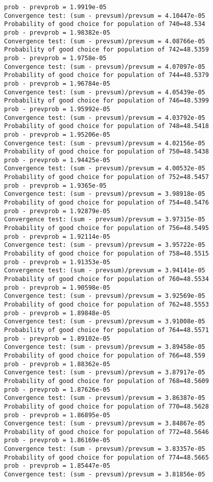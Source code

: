 \documentclass[11pt,onecolumn]{article}
\begin{document}
\begin{verbatim}
prob - prevprob = 1.9919e-05
Convergence test: (sum - prevsum)/prevsum = 4.10447e-05
Probability of good choice for population of 740=48.534
prob - prevprob = 1.98382e-05
Convergence test: (sum - prevsum)/prevsum = 4.08766e-05
Probability of good choice for population of 742=48.5359
prob - prevprob = 1.9758e-05
Convergence test: (sum - prevsum)/prevsum = 4.07097e-05
Probability of good choice for population of 744=48.5379
prob - prevprob = 1.96784e-05
Convergence test: (sum - prevsum)/prevsum = 4.05439e-05
Probability of good choice for population of 746=48.5399
prob - prevprob = 1.95992e-05
Convergence test: (sum - prevsum)/prevsum = 4.03792e-05
Probability of good choice for population of 748=48.5418
prob - prevprob = 1.95206e-05
Convergence test: (sum - prevsum)/prevsum = 4.02156e-05
Probability of good choice for population of 750=48.5438
prob - prevprob = 1.94425e-05
Convergence test: (sum - prevsum)/prevsum = 4.00532e-05
Probability of good choice for population of 752=48.5457
prob - prevprob = 1.9365e-05
Convergence test: (sum - prevsum)/prevsum = 3.98918e-05
Probability of good choice for population of 754=48.5476
prob - prevprob = 1.92879e-05
Convergence test: (sum - prevsum)/prevsum = 3.97315e-05
Probability of good choice for population of 756=48.5495
prob - prevprob = 1.92114e-05
Convergence test: (sum - prevsum)/prevsum = 3.95722e-05
Probability of good choice for population of 758=48.5515
prob - prevprob = 1.91353e-05
Convergence test: (sum - prevsum)/prevsum = 3.94141e-05
Probability of good choice for population of 760=48.5534
prob - prevprob = 1.90598e-05
Convergence test: (sum - prevsum)/prevsum = 3.92569e-05
Probability of good choice for population of 762=48.5553
prob - prevprob = 1.89848e-05
Convergence test: (sum - prevsum)/prevsum = 3.91008e-05
Probability of good choice for population of 764=48.5571
prob - prevprob = 1.89102e-05
Convergence test: (sum - prevsum)/prevsum = 3.89458e-05
Probability of good choice for population of 766=48.559
prob - prevprob = 1.88362e-05
Convergence test: (sum - prevsum)/prevsum = 3.87917e-05
Probability of good choice for population of 768=48.5609
prob - prevprob = 1.87626e-05
Convergence test: (sum - prevsum)/prevsum = 3.86387e-05
Probability of good choice for population of 770=48.5628
prob - prevprob = 1.86895e-05
Convergence test: (sum - prevsum)/prevsum = 3.84867e-05
Probability of good choice for population of 772=48.5646
prob - prevprob = 1.86169e-05
Convergence test: (sum - prevsum)/prevsum = 3.83357e-05
Probability of good choice for population of 774=48.5665
prob - prevprob = 1.85447e-05
Convergence test: (sum - prevsum)/prevsum = 3.81856e-05

\end{verbatim}
\end{document}
